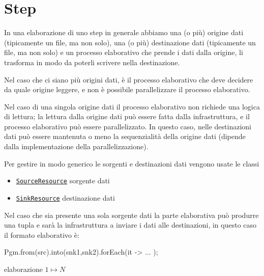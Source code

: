 \chapter{Step}

In una elaborazione di uno step in generale abbiamo una (o più) origine dati
(tipicamente un file, ma non solo), una (o più) destinazione dati (tipicamente
un file, ma non solo) e un processo elaborativo che prende i dati dalla origine,
li trasforma in modo da poterli scrivere nella destinazione.

Nel caso che ci siano più origini dati, è il processo elaborativo che deve
decidere da quale origine leggere, e non è possibile parallelizzare il processo
elaborativo.

Nel caso di una singola origine dati il processo elaborativo non richiede una
logica di lettura; la lettura dalla origine dati può essere fatta dalla
infrastruttura, e il processo elaborativo può essere parallelizzato.
In questo caso, nelle destinazioni dati può essere mantenuta o meno la
sequenzialità della origine dati (dipende dalla implementazione della
parallelizzazione).

Per gestire in modo generico le sorgenti e destinazioni dati vengono usate le
classi
\begin{itemize}
    \item \hyperref[sec:srcRes]{\texttt{SourceResource}} sorgente dati
    \item \hyperref[sec:snkRes]{\texttt{SinkResource}} destinazione dati
\end{itemize}

Nel caso che sia presente una sola sorgente dati la parte elaborativa può
produrre una tupla e sarà la infrastruttura a inviare i dati alle destinazioni,
in questo caso il formato elaborativo è:
\begin{elisting}[!htb]
\begin{javacode}
    Pgm.from(src).into(snk1,snk2).forEach(it -> { ... });
\end{javacode}
\caption{elaborazione $1\mapsto N$}
\label{lst:processTuple}
\end{elisting}


